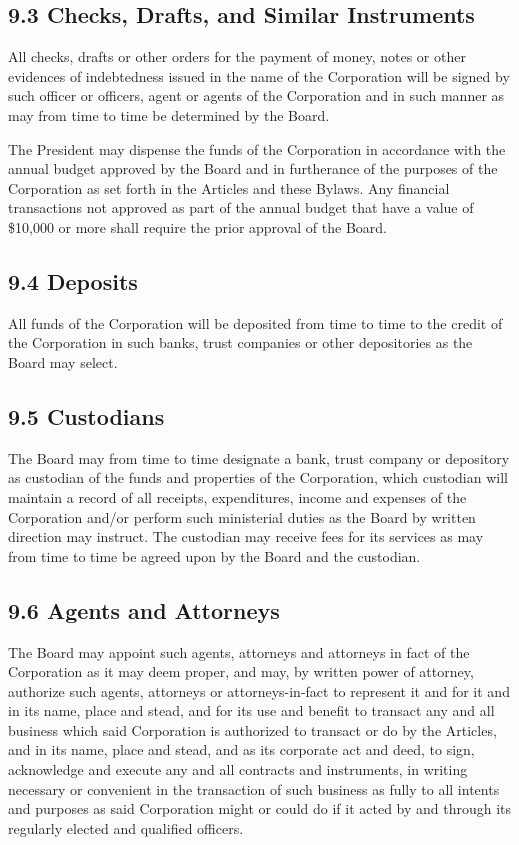 \documentclass[
]{book}
\begin{document}
\subsection{9.3 Checks, Drafts, and Similar Instruments}\label{checks-drafts-and-similar-instruments}

All checks, drafts or other orders for the payment of money, notes or other evidences of indebtedness issued in the name of the Corporation will be signed by such officer or officers, agent or agents of the Corporation and in such manner as may from time to time be determined by the Board.

The President may dispense the funds of the Corporation in accordance with the annual budget approved by the Board and in furtherance of the purposes of the Corporation as set forth in the Articles and these Bylaws. Any financial transactions not approved as part of the annual budget that have a value of \$10,000 or more shall require the prior approval of the Board.

\subsection{9.4 Deposits}\label{deposits}

All funds of the Corporation will be deposited from time to time to the credit of the Corporation in such banks, trust companies or other depositories as the Board may select.

\subsection{9.5 Custodians}\label{custodians}

The Board may from time to time designate a bank, trust company or depository as custodian of the funds and properties of the Corporation, which custodian will maintain a record of all receipts, expenditures, income and expenses of the Corporation and/or perform such ministerial duties as the Board by written direction may instruct. The custodian may receive fees for its services as may from time to time be agreed upon by the Board and the custodian.

\subsection{9.6 Agents and Attorneys}\label{agents-and-attorneys}

The Board may appoint such agents, attorneys and attorneys in fact of the Corporation as it may deem proper, and may, by written power of attorney, authorize such agents, attorneys or attorneys-in-fact to represent it and for it and in its name, place and stead, and for its use and benefit to transact any and all business which said Corporation is authorized to transact or do by the Articles, and in its name, place and stead, and as its corporate act and deed, to sign, acknowledge and execute any and all contracts and instruments, in writing necessary or convenient in the transaction of such business as fully to all intents and purposes as said Corporation might or could do if it acted by and through its regularly elected and qualified officers.
\end{document}
